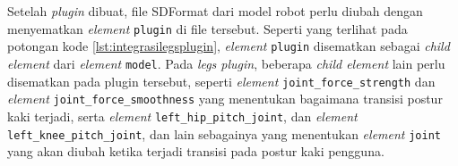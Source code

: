 Setelah \emph{plugin} dibuat,
  file SDFormat dari model robot perlu diubah dengan menyematkan \emph{element} \lstinline{plugin} di file tersebut.
Seperti yang terlihat pada potongan kode \ref{lst:integrasilegsplugin},
  \emph{element} \lstinline{plugin} disematkan sebagai \emph{child element} dari \emph{element} \lstinline{model}.
Pada \emph{legs plugin},
  beberapa \emph{child element} lain perlu disematkan pada plugin tersebut,
  seperti \emph{element} \lstinline{joint_force_strength} dan \emph{element} \lstinline{joint_force_smoothness} yang menentukan bagaimana transisi postur kaki terjadi,
  serta \emph{element} \lstinline{left_hip_pitch_joint}, dan \emph{element} \lstinline{left_knee_pitch_joint}, dan lain sebagainya yang menentukan \emph{element} \lstinline{joint} yang akan diubah ketika terjadi transisi pada postur kaki pengguna.



